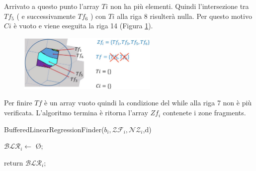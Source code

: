 Arrivato a questo punto l'array $Ti$ non ha più elementi. Quindi l'intersezione tra $Tf_5$ ( e successivamente $Tf_6$ ) con $Ti$ alla riga 8 risulterà nulla. Per questo motivo $Ci$ è vuoto e viene eseguita la riga 14 (Figura \ref{pseudo7}).

\begin{figure}[h]
	\centering
	\includegraphics[width=0.6\textwidth]{images/pseudo7}
	\caption{}
	\label{pseudo7}
\end{figure}

Per finire $Tf$ è un array vuoto quindi la condizione del while alla riga 7 non è più verificata. L'algoritmo termina è ritorna l'array $Zf_i$ contenete i zone fragments.

\newpage
	

\begin{algorithm}[H]
	
	\IncMargin{1em}
	\caption{BufferedLinearRegressionFinder($b_i , \mathcal{ZF}_i , \mathcal{NZ}_i$,d)}
	\label{alg:four}
	\BlankLine
	\SetAlgoNoLine
	$\mathcal{BLR}_i \leftarrow$ \O ;\\
	
	return $\mathcal{BLR}_i;$
	
\end{algorithm}

